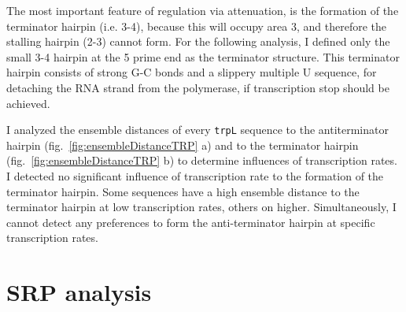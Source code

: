 \documentclass[ twoside,openright,titlepage,numbers=noenddot,headinclude,%
                footinclude=false, cleardoublepage=empty,abstractoff, %
                BCOR=5mm,paper=a4,fontsize=11pt,%
                ngerman,american,%
                ]{scrreprt}
\begin{document}
The most important feature of regulation via attenuation, is the formation of the terminator hairpin (i.e. 3-4), because this will occupy area 3, and therefore the stalling hairpin (2-3) cannot form. 
For the following analysis, I defined only the small 3-4 hairpin at the 5 prime end as the terminator structure. This terminator hairpin consists of strong G-C bonds and a slippery multiple U sequence, for detaching the RNA strand from the polymerase, if transcription stop should be achieved.

I analyzed the ensemble distances of every \texttt{trpL} sequence to the antiterminator hairpin (fig.~\ref{fig:ensembleDistanceTRP} a) and to the terminator hairpin (fig.~\ref{fig:ensembleDistanceTRP} b) to determine influences of transcription rates.
I detected no significant influence of transcription rate to the formation of the terminator hairpin. Some sequences have a high ensemble distance to the terminator hairpin at low transcription rates, others on higher.
Simultaneously, I cannot detect any preferences to form the anti-terminator hairpin at specific transcription rates.




\section{SRP analysis}
\end{document}
